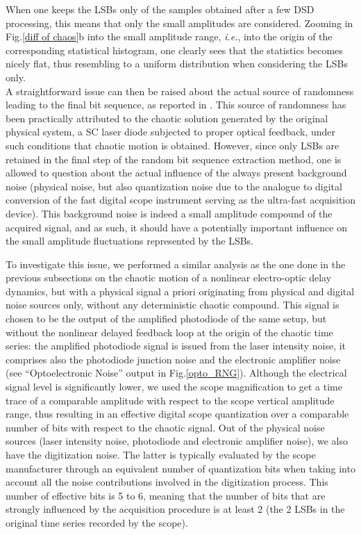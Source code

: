 When one keeps the LSBs only of the samples obtained after a few DSD
processing, this means that only the small amplitudes are
considered. Zooming in Fig.\ref{diff of chaos}b into the small
amplitude range, \emph{i.e.}, into the origin of the corresponding
statistical histogram, one clearly sees that the statistics becomes
nicely flat, thus resembling to a uniform distribution when
considering the LSBs
only.\\
A straightforward issue can then be raised about the actual source of
randomness leading to the final bit sequence, as reported in
\cite{ultrafast2009,ultrafast2010}. This source of randomness has been
practically attributed to the chaotic solution generated by the
original physical system, a SC laser diode subjected to proper optical
feedback, under such conditions that chaotic motion is
obtained. However, since only LSBs are retained in the final step of
the random bit sequence extraction method, one is allowed to question
about the actual influence of the always present background noise
(physical noise, but also quantization noise due to the analogue to
digital conversion of the fast digital scope instrument serving as the
ultra-fast acquisition device). This background noise is indeed a
small amplitude compound of the acquired signal, and as such, it
should have a potentially important influence on the small amplitude
fluctuations represented by the LSBs.

To investigate this issue, we performed a similar analysis as the one
done in the previous subsections on the chaotic motion of a nonlinear
electro-optic delay dynamics, but with a physical signal a priori
originating from physical and digital noise sources only, without any
deterministic chaotic compound. This signal is chosen to be the output
of the amplified photodiode of the same setup, but without the
nonlinear delayed feedback loop at the origin of the chaotic time
series: the amplified photodiode signal is issued from the laser
intensity noise, it comprises also the photodiode junction noise and
the electronic amplifier noise (see ``Optoelectronic Noise'' output in
Fig.\ref{opto_RNG}). Although the electrical signal level is
significantly lower, we used the scope magnification to get a time
trace of a comparable amplitude with respect to the scope vertical
amplitude range, thus resulting in an effective digital scope
quantization over a comparable number of bits with respect to the
chaotic signal. Out of the physical noise sources (laser intensity
noise, photodiode and electronic amplifier noise), we also have the
digitization noise. The latter is typically evaluated by the scope
manufacturer through an equivalent number of quantization bits when
taking into account all the noise contributions involved in the
digitization process. This number of effective bits is 5 to 6, meaning
that the number of bits that are strongly influenced by the
acquisition procedure is at least 2 (the 2 LSBs in the original time
series recorded by the scope).

